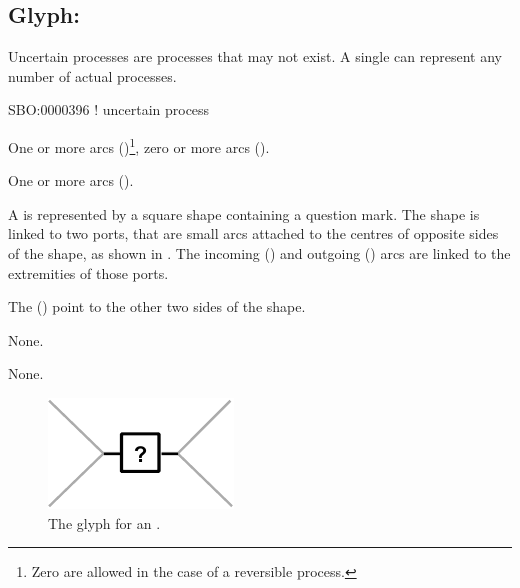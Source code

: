 \subsection{Glyph: }
\label{sec:uncertain}

Uncertain processes are processes that may not exist. A single  can represent any number of actual processes.

\begin{glyphDescription}

\glyphSboTerm
SBO:0000396 ! uncertain process


\glyphIncoming
One or more  arcs ()\footnote{Zero  are allowed in the case of a reversible process.}, zero or more  arcs ().



\glyphOutgoing
One or more  arcs ().


\glyphContainer
A  is represented by a square shape containing a question mark.
The shape is linked to two ports, that are small arcs attached to the centres of opposite sides of the shape, as shown in .
The incoming  () and outgoing  () arcs are linked to the extremities of those ports.

The  () point to the other two sides of the shape.

\glyphLabel
None.

\glyphAux
None.

\end{glyphDescription}

\begin{figure}[H]
  \centering
  \includegraphics{images/uncertain}
  \caption{The \PD glyph for an .}
  \label{fig:uncertain}
\end{figure}
